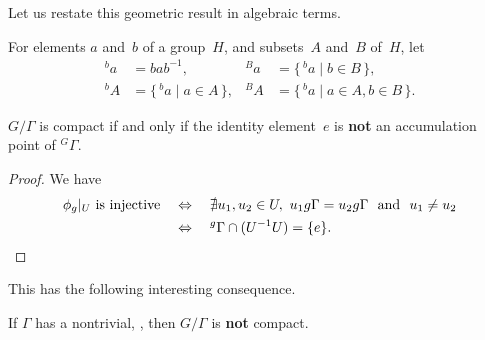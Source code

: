Let us restate this geometric result in algebraic terms.

\begin{notation}
 For elements $a$ and~$b$ of a group~$H$, and subsets~$A$
and~$B$ of~$H$, let%
\begin{align*}
	{}^b \! a &= b a b^{-1} , 
	&
	{}^B \! a &= \{\, {}^b \!a \mid b \in B\,\}, \\
 	{}^b \! A &= \{\, {}^b \!a \mid a \in A \,\}, 
 	&
	{}^B \! A &= \{\, {}^b \!a \mid a\in A, b \in B \,\}
 	. \end{align*}
  \end{notation}

\begin{cor} \label{G/GammaCpct<>NoAccPt}
 $G/\Gamma$ is compact if and only if the
identity element~$e$ is \textbf{not} an accumulation point
of\/ ${}^G\Gamma$.
 \end{cor}

\begin{proof}
 We have
\begin{align*} 
\text{$\phi_g|_U$ is injective}
 &\quad \Leftrightarrow \quad 
 \nexists u_1,u_2 \in U, \ 
 \text{$u_1 g \Gamma = u_2 g \Gamma$ \  and \ $u_1 \neq u_2$}
 \\&\quad \Leftrightarrow \quad 
 {}^g \Gamma \cap (U^{-1} U) = \{e\} 
 . \qedhere \end{align*}
 \end{proof}

This has the following interesting consequence.

\begin{cor} \label{GammaUnip->notcpct}
 If\/ $\Gamma$ has a nontrivial, , then
$G/\Gamma$ is \textbf{not} compact.
 \end{cor}

